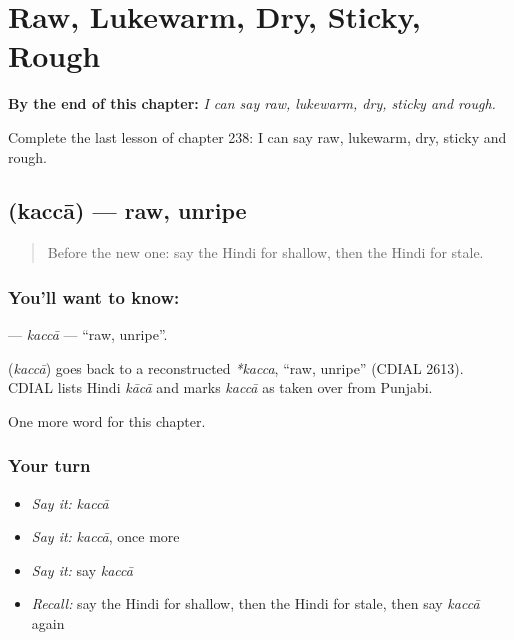 
\chapter{Raw, Lukewarm, Dry, Sticky, Rough}
\label{ch:hi-raw-lukewarm-dry-sticky-rough}

\begin{chapteropening}
\textbf{By the end of this chapter:} \emph{I can say raw, lukewarm, dry, sticky and rough.}

Complete the last lesson of chapter 238: I can say raw, lukewarm, dry, sticky and rough.
\end{chapteropening}

\section[\texorpdfstring{\hi{कच्चा} (kaccā)}{कच्चा (kaccā)}]{ (kaccā) — raw, unripe}

\label{lesson:HI-C238-kacca}



\begin{quote}
Before the new one: say the Hindi for shallow, then the Hindi for stale.
\end{quote}

\subsection*{You'll want to know: }
\textbf{} — \emph{kaccā} — \textquotedblleft{}raw, unripe\textquotedblright{}.

\begin{cousinweb}
\textbf{} (\emph{kaccā}) goes back to a reconstructed \emph{*kacca}, \textquotedblleft{}raw, unripe\textquotedblright{} (CDIAL 2613). CDIAL lists Hindi \emph{kācā} and marks \emph{kaccā} as taken over from Punjabi.
\end{cousinweb}

\begin{grammarlens}[title={What you've built}]
One more word for this chapter.
\end{grammarlens}

\subsection*{Your turn}
\begin{itemize}
\raggedright
  \item \emph{Say it:} \emph{kaccā}
  \item \emph{Say it:} \emph{kaccā}, once more
  \item \emph{Say it:} say \emph{kaccā}
  \item \emph{Recall:} say the Hindi for shallow, then the Hindi for stale, then say \emph{kaccā} again
\end{itemize}

